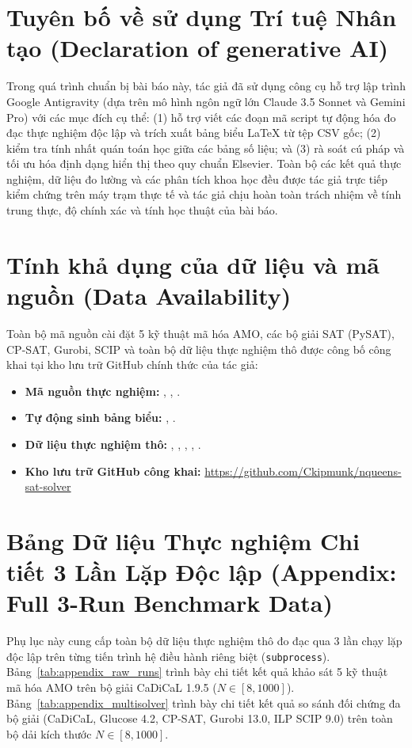 \documentclass[a4paper,fleqn]{cas-sc}
\begin{document}
\section*{Tuyên bố về sử dụng Trí tuệ Nhân tạo (Declaration of generative AI)}
Trong quá trình chuẩn bị bài báo này, tác giả đã sử dụng công cụ hỗ trợ lập trình Google Antigravity (dựa trên mô hình ngôn ngữ lớn Claude 3.5 Sonnet và Gemini Pro) với các mục đích cụ thể: (1) hỗ trợ viết các đoạn mã script tự động hóa đo đạc thực nghiệm độc lập và trích xuất bảng biểu LaTeX từ tệp CSV gốc; (2) kiểm tra tính nhất quán toán học giữa các bảng số liệu; và (3) rà soát cú pháp và tối ưu hóa định dạng hiển thị theo quy chuẩn Elsevier. Toàn bộ các kết quả thực nghiệm, dữ liệu đo lường và các phân tích khoa học đều được tác giả trực tiếp kiểm chứng trên máy trạm thực tế và tác giả chịu hoàn toàn trách nhiệm về tính trung thực, độ chính xác và tính học thuật của bài báo.

\section*{Tính khả dụng của dữ liệu và mã nguồn (Data Availability)}
Toàn bộ mã nguồn cài đặt 5 kỹ thuật mã hóa AMO, các bộ giải SAT (PySAT), CP-SAT, Gurobi, SCIP và toàn bộ dữ liệu thực nghiệm thô được công bố công khai tại kho lưu trữ GitHub chính thức của tác giả:
\begin{itemize}
    \item \textbf{Mã nguồn thực nghiệm:} , , .
    \item \textbf{Tự động sinh bảng biểu:} , .
    \item \textbf{Dữ liệu thực nghiệm thô:} , , , , .
    \item \textbf{Kho lưu trữ GitHub công khai:} \url{https://github.com/Ckipmunk/nqueens-sat-solver}
\end{itemize}

\appendix
\section{Bảng Dữ liệu Thực nghiệm Chi tiết 3 Lần Lặp Độc lập (Appendix: Full 3-Run Benchmark Data)}
Phụ lục này cung cấp toàn bộ dữ liệu thực nghiệm thô đo đạc qua 3 lần chạy lặp độc lập trên từng tiến trình hệ điều hành riêng biệt (\texttt{subprocess}). Bảng~\ref{tab:appendix_raw_runs} trình bày chi tiết kết quả khảo sát 5 kỹ thuật mã hóa AMO trên bộ giải CaDiCaL 1.9.5 ($N \in [8, 1000]$). Bảng~\ref{tab:appendix_multisolver} trình bày chi tiết kết quả so sánh đối chứng đa bộ giải (CaDiCaL, Glucose 4.2, CP-SAT, Gurobi 13.0, ILP SCIP 9.0) trên toàn bộ dải kích thước $N \in [8, 1000]$.
\end{document}
